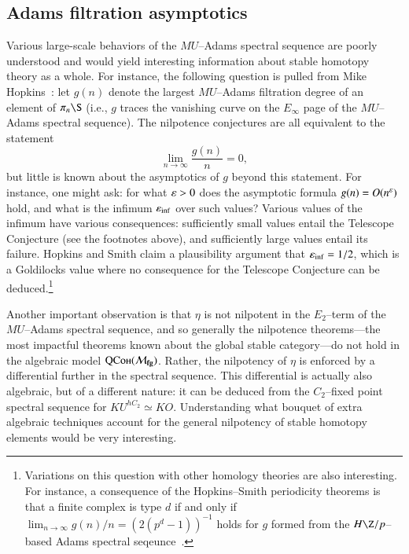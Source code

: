 \subsection*{Adams filtration asymptotics}

Various large-scale behaviors of the $MU$--Adams spectral sequence are poorly understood and would yield interesting information about stable homotopy theory as a whole.  For instance, the following question is pulled from Mike Hopkins~\cite[Section 10]{HopkinsOnRavenel}: let $g(n)$ denote the largest $MU$--Adams filtration degree of an element of $\pi_n \S$ (i.e., $g$ traces the vanishing curve on the $E_\infty$ page of the $MU$--Adams spectral sequence).  The nilpotence conjectures are all equivalent to the statement \[\lim_{n \to \infty} \frac{g(n)}{n} = 0,\] but little is known about the asymptotics of $g$ beyond this statement.  For instance, one might ask: for what $\varepsilon > 0$ does the asymptotic formula $g(n) = O(n^{\varepsilon})$ hold, and what is the infimum $\varepsilon_{\inf}$ over such values?  Various values of the infimum have various consequences: sufficiently small values entail the Telescope Conjecture (see the footnotes above), and sufficiently large values entail its failure.  Hopkins and Smith claim a plausibility argument that $\varepsilon_{\inf} = 1/2$, which is a Goldilocks value where no consequence for the Telescope Conjecture can be deduced.\footnote{Variations on this question with other homology theories are also interesting.  For instance, a consequence of the Hopkins--Smith periodicity theorems is that a finite complex is type $d$ if and only if $\lim_{n \to \infty} g(n) / n = (2(p^d-1))^{-1}$ holds for $g$ formed from the $H\Z/p$--based Adams spectral seqeunce~\cite[Section 3.5]{HopkinsICMZurich}.}

Another important observation is that $\eta$ is not nilpotent in the $E_2$--term of the $MU$--Adams spectral sequence, and so generally the nilpotence theorems---the most impactful theorems known about the global stable category---do not hold in the algebraic model $\normalfont\textsc{QCoh}(\mathcal{M}_{\mathbf{fg}})$.  Rather, the nilpotency of $\eta$ is enforced by a differential further in the spectral sequence.  This differential is actually also algebraic, but of a different nature: it can be deduced from the $C_2$--fixed point spectral sequence for $KU^{hC_2} \simeq KO$.  Understanding what bouquet of extra algebraic techniques account for the general nilpotency of stable homotopy elements would be very interesting.

